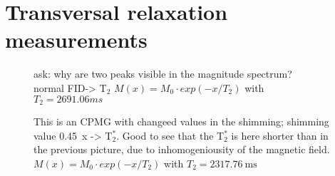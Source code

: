 \section{Transversal relaxation measurements}
\label{sec:Transversalrelaxationmeasurements}

\begin{figure}[H]
    \centering
    
    \caption[]{ask: why are two peaks visible in the magnitude spectrum?\\
    normal FID-> T$_2$\newline
     $M(x)=M_0 \cdot exp(-x/T_2)$ with $T_2=\si{2691.06}{ms}$}
    \label{fig:T2}
\end{figure}

\begin{figure}[H]
    \centering
    
    \caption[]{This is an CPMG with changeed values in the shimming; shimming value \SI{0.45}{x} -> T$_2^*$.\newline
    Good to see that the T$_2^*$ is here shorter than in the previous picture, due to inhomogeniousity of the magnetic field.\\
    $M(x)=M_0 \cdot exp(-x/T_2)$ with $T_2=\SI{2317.76}{\milli \second}$}
    \label{fig:CPMG}
\end{figure}
